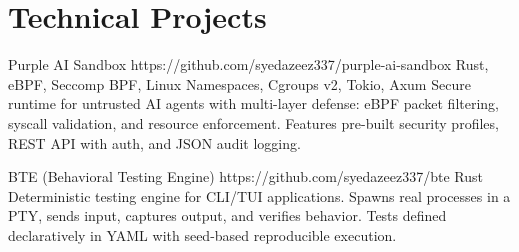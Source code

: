 
\section{Technical Projects}

\projectlink
    {Purple AI Sandbox}
    {https://github.com/syedazeez337/purple-ai-sandbox}
    {Rust, eBPF, Seccomp BPF, Linux Namespaces, Cgroups v2, Tokio, Axum}
    {Secure runtime for untrusted AI agents with multi-layer defense: eBPF packet
     filtering, syscall validation, and resource enforcement. Features pre-built
     security profiles, REST API with auth, and JSON audit logging.}

\projectlink
    {BTE (Behavioral Testing Engine)}
    {https://github.com/syedazeez337/bte}
    {Rust}
    {Deterministic testing engine for CLI/TUI applications. Spawns real processes
     in a PTY, sends input, captures output, and verifies behavior. Tests defined
     declaratively in YAML with seed-based reproducible execution.}
